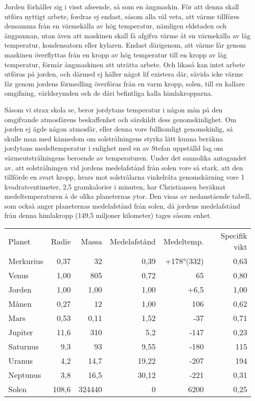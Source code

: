 \documentclass[a4paper, 12pt, oneside, swedish]{article}
\begin{document}
Jorden förhåller sig i visst afseende, så som en ångmaskin. För att denna skall utföra nyttigt arbete, fordras ej endast, såsom alla väl veta, att värme tillföres densamma från en värmekälla av hög temperatur, nämligen eldstaden och ångpannan, utan även att maskinen skall få afgifva värme åt en värmekälla av låg temperatur, kondensatorn eller kylaren. Endast därigenom, att värme får genom maskinen överflyttas från en kropp av hög temperatur till en kropp av låg temperatur, förmår ångmaskinen att uträtta arbete. Och likaså kan intet arbete utföras på jorden, och därmed ej häller något lif existera där, såvida icke värme får genom jordens förmedling överföras från en varm kropp, solen, till en kallare omgifning, världsrymden och de däri befintliga kalla himlakropparna.

Såsom vi strax skola se, beror jordytans temperatur i någon mån på den omgifvande atmosfärens beskaffenhet och särskildt dess genomskinlighet. Om jorden ej ägde någon atmosfär, eller denna vore fullkomligt genomskinlig, så skulle man med kännedom om solstrålningens styrka lätt kunna beräkna jordytans medeltemperatur i enlighet med en av Stefan uppställd lag om värmeutstrålningens beroende av temperaturen. Under det sannolika antagandet av, att solstrålningen vid jordens medelafstånd från solen vore så stark, att den tillförde en svart kropp, hvars mot solstrålarna vinkelräta genomskärning vore 1 kvadratcentimeter, 2,5 gramkalorier i minuten, har Christiansen beräknat medeltemperaturen å de olika planeternas ytor. Den visas av nedanstående tabell, som också anger planeternas medelafstånd från solen, då jordens medelafstånd från denna himlakropp (149,5 miljoner kilometer) tages såsom enhet.

\begin{table}[H]
    \centering
    \footnotesize
    \begin{tabular}{l r r r r r}
        Planet & Radie & Massa & Medelafstånd & Medeltemp. & Specifik vikt   \\
        Merkurius & 0,37 & 32 & 0,39 & +178°(332) & 0,63   \\
        Venus & 1,00 & 805 & 0,72 & 65 & 0,80   \\
        Jorden & 1,00 & 1,00 & 1,00 & +6,5 & 1,00   \\
        Månen & 0,27 & 12 & 1,00 & 106 & 0,62   \\
        Mars & 0,53 & 0,11 & 1,52 & -37 & 0,71   \\
        Jupiter & 11,6 & 310 & 5,2 & -147 & 0,23   \\
        Saturnus & 9,3 & 93 & 9,55 & -180 & 115 \\
        Uranus & 4,2 & 14,7 & 19,22 & -207 & 194 \\
        Neptunus & 3,8 & 16,5 & 30,12 & -221 & 0,31   \\
        Solen & 108,6 & 324440 & 0 & 6200 & 0,25 \\
    \end{tabular}
\end{table}
\end{document}
